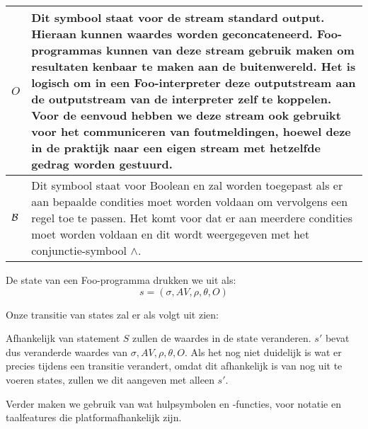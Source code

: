 \documentclass[11pt]{article}
\begin{document}
\begin{tabular}{ | l | p{12cm} |}
    \begin{math} O \end{math} &  Dit symbool staat voor de stream standard output. Hieraan kunnen waardes worden geconcateneerd. Foo-programmas kunnen van deze stream gebruik maken om resultaten kenbaar te maken aan de buitenwereld. Het is logisch om in een Foo-interpreter deze outputstream aan de outputstream van de interpreter zelf te koppelen. Voor de eenvoud hebben we deze stream ook gebruikt voor het communiceren van foutmeldingen, hoewel deze in de praktijk naar een eigen stream met hetzelfde gedrag worden gestuurd. \\ \hline
    \begin{math} {\cal B} \end{math} &  Dit symbool staat voor Boolean en zal worden toegepast als er aan bepaalde condities moet worden voldaan om vervolgens een regel toe te passen. Het komt voor dat er aan meerdere condities moet worden voldaan en dit wordt weergegeven met het conjunctie-symbool $\land$. \\ \hline

\end{tabular}
\newline
\newline

De state van een Foo-programma drukken we uit als:
\[
s = (\sigma, AV, \rho, \theta, O)
\]
\newpage

Onze transitie van states zal er als volgt uit zien:
\begin{prooftree}
\end{prooftree}

Afhankelijk van statement $S$ zullen de waardes in de state veranderen. 
$s'$ bevat dus veranderde waardes van $\sigma, AV, \rho, \theta, O$. 
Als het nog niet duidelijk is wat er precies tijdens een transitie verandert, omdat dit afhankelijk is van nog uit te voeren states, zullen we dit aangeven met alleen $s'$.


Verder maken we gebruik van wat hulpsymbolen en -functies, voor notatie en taalfeatures die platformafhankelijk zijn.
\newline
\end{document}
